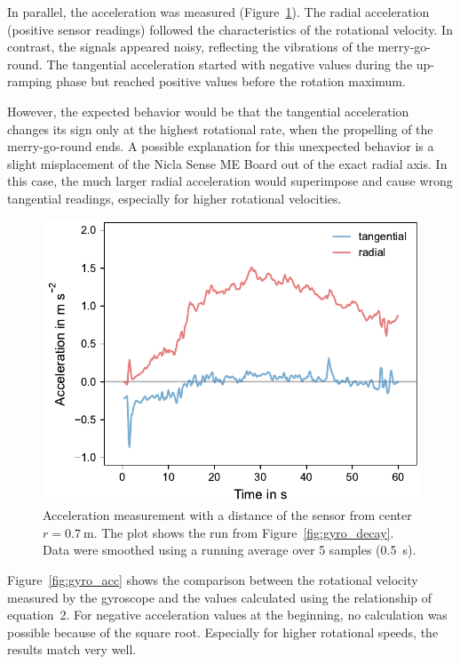 \documentclass[DIV=14]{scrarticle}
\begin{document}
In parallel, the acceleration was measured (Figure~\ref{fig:acc}). The radial acceleration (positive sensor readings) followed the characteristics of the rotational velocity. In contrast, the signals appeared noisy, reflecting the vibrations of the merry-go-round. The tangential acceleration started with negative values during the up-ramping phase but reached positive values before the rotation maximum. 

However, the expected behavior would be that the tangential acceleration changes its sign only at the highest rotational rate, when the propelling of the merry-go-round ends. A possible explanation for this unexpected behavior is a slight misplacement of the Nicla Sense ME Board out of the exact radial axis. In this case, the much larger radial acceleration would superimpose and cause wrong tangential readings, especially for higher rotational velocities.

\begin{figure}[h!]
    \centering
    \includegraphics[width=.6\textwidth]{plots/acc_2.pdf}
    \caption{Acceleration measurement with a distance of the sensor from center $r=\SI{0.7}{\metre}$. The plot shows the run from Figure~\ref{fig:gyro_decay}. Data were smoothed using a running average over 5 samples (\SI{0.5}{\second}).}
    \label{fig:acc}
\end{figure}

Figure~\ref{fig:gyro_acc} shows the comparison between the rotational velocity measured by the gyroscope and the values calculated using the relationship of equation~2. For negative acceleration values at the beginning, no calculation was possible because of the square root. Especially for higher rotational speeds, the results match very well.
\end{document}
